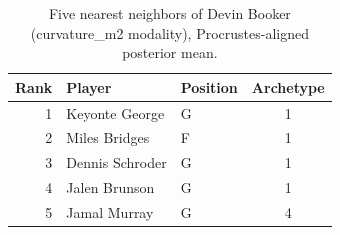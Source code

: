 \begin{table}[htbp]
  \centering\small
  \begin{tabular}{rllc}
    \toprule
    Rank & Player & Position & Archetype \\
    \midrule
    1 & Keyonte George & G & 1 \\
    2 & Miles Bridges & F & 1 \\
    3 & Dennis Schroder & G & 1 \\
    4 & Jalen Brunson & G & 1 \\
    5 & Jamal Murray & G & 4 \\
    \bottomrule
  \end{tabular}
  \caption{Five nearest neighbors of Devin Booker (curvature_m2 modality), Procrustes-aligned posterior mean.}
  \label{tab:Devin_Booker_neighbors_curvature_m2}
\end{table}

